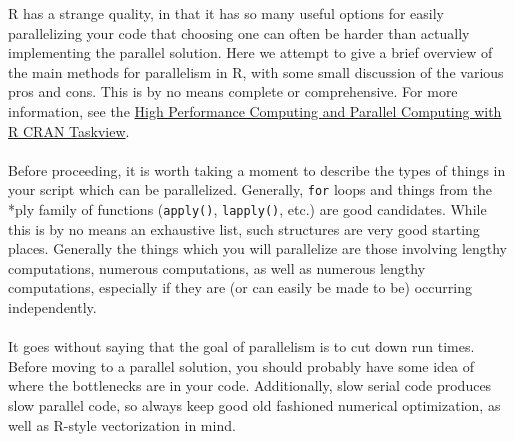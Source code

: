 
R has a strange quality, in that it has so many useful options for easily parallelizing your code that choosing one can often be harder than actually implementing the parallel solution.  Here we attempt to give a brief overview of the main methods for parallelism in R, with some small discussion of the various pros and cons.  This is by no means complete or comprehensive.  For more information, see the \href{http://cran.r-project.org/web/views/HighPerformanceComputing.html}{High Performance Computing and Parallel Computing with R CRAN Taskview}.\\\\
%
Before proceeding, it is worth taking a moment to describe the types of things in your script which can be parallelized.  Generally, \texttt{for} loops and things from the *ply family of functions (\texttt{apply()}, \texttt{lapply()}, etc.) are good candidates.  While this is by no means an exhaustive list, such structures are very good starting places.  Generally the things which you will parallelize are those involving lengthy computations, numerous computations, as well as numerous lengthy computations, especially if they are (or can easily be made to be) occurring independently.\\\\
%
It goes without saying that the goal of parallelism is to cut down run times.  Before moving to a parallel solution, you should probably have some idea of where the bottlenecks are in your code.  Additionally, slow serial code produces slow parallel code, so always keep good old fashioned numerical optimization, as well as R-style vectorization in mind.


